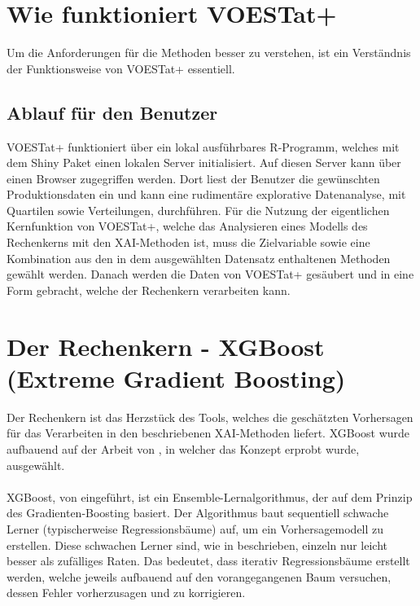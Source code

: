 \documentclass[12pt,titlepage,oneside]{book}
\begin{document}
\section{Wie funktioniert VOESTat+}
Um die Anforderungen für die Methoden besser zu verstehen, ist ein Verständnis der Funktionsweise von VOESTat+ essentiell.
\subsection{Ablauf für den Benutzer}
VOESTat+ funktioniert über ein lokal ausführbares R-Programm, welches mit dem Shiny Paket einen lokalen Server initialisiert. Auf diesen Server kann über einen Browser zugegriffen werden. Dort liest der Benutzer die gewünschten Produktionsdaten ein und kann eine rudimentäre explorative Datenanalyse, mit Quartilen sowie Verteilungen, durchführen. Für die Nutzung der eigentlichen Kernfunktion von VOESTat+, welche das Analysieren eines Modells des Rechenkerns mit den XAI-Methoden ist, muss die Zielvariable sowie eine Kombination aus den in dem ausgewählten Datensatz enthaltenen Methoden gewählt werden. Danach werden die Daten von VOESTat+ gesäubert und in eine Form gebracht, welche der Rechenkern verarbeiten kann.



\section{Der Rechenkern - XGBoost (Extreme Gradient Boosting)}
Der Rechenkern ist das Herzstück des Tools, welches die geschätzten Vorhersagen für das Verarbeiten in den beschriebenen XAI-Methoden liefert. XGBoost wurde aufbauend auf der Arbeit von \cite{mayrhofer2021explainable}, in welcher das Konzept erprobt wurde, ausgewählt.\\ \\
XGBoost, von \cite{chen2016xgboost} eingeführt,  ist ein Ensemble-Lernalgorithmus, der auf dem Prinzip des Gradienten-Boosting basiert. Der Algorithmus baut sequentiell schwache Lerner (typischerweise Regressionsbäume) auf, um ein Vorhersagemodell zu erstellen. Diese schwachen Lerner sind, wie in \cite{schapire1990strength} beschrieben, einzeln nur leicht besser als zufälliges Raten. Das bedeutet, dass iterativ Regressionsbäume erstellt werden, welche jeweils aufbauend auf den vorangegangenen Baum versuchen, dessen Fehler vorherzusagen und zu korrigieren.
\end{document}
